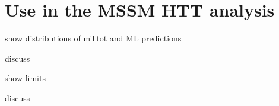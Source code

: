 \section{Use in the MSSM HTT analysis}\label{chapter-ML-section-use_HTT}

show distributions of mTtot and ML predictions

discuss

show limits

discuss
